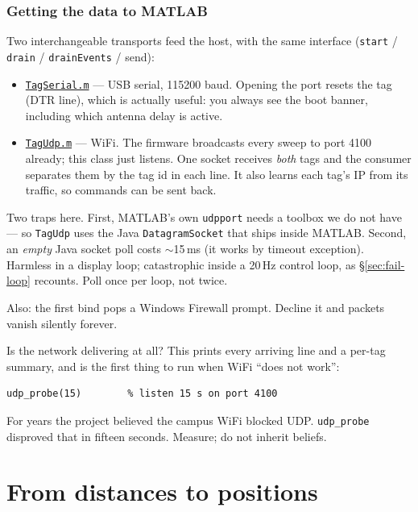 \documentclass[11pt,a4paper]{article}
\newcommand{\gh}[2]{\href{https://github.com/AdershM-2/UWB_3/blob/main/#1}{\texttt{#2}}}
\newcommand{\code}[1]{\texttt{#1}}
\begin{document}
\section{Getting the data to MATLAB}
\label{sec:transport}

Two interchangeable transports feed the host, with the same interface
(\code{start} / \code{drain} / \code{drainEvents} / send):

\begin{itemize}
\item \gh{matlab/+dune/TagSerial.m}{TagSerial.m} --- USB serial, 115200 baud.
      Opening the port resets the tag (DTR line), which is actually useful: you
      always see the boot banner, including which antenna delay is active.
\item \gh{matlab/+dune/TagUdp.m}{TagUdp.m} --- WiFi. The firmware broadcasts every
      sweep to port 4100 already; this class just listens. One socket receives
      \emph{both} tags and the consumer separates them by the tag id in each line.
      It also learns each tag's IP from its traffic, so commands can be sent back.
\end{itemize}

\begin{pitfall}
Two traps here. First, MATLAB's own \code{udpport} needs a toolbox we do not have
--- so \code{TagUdp} uses the Java \code{DatagramSocket} that ships inside MATLAB.
Second, an \emph{empty} Java socket poll costs $\sim$15\,ms (it works by timeout
exception). Harmless in a display loop; catastrophic inside a 20\,Hz control loop,
as \S\ref{sec:fail-loop} recounts. Poll once per loop, not twice.

Also: the first bind pops a Windows Firewall prompt. Decline it and packets vanish
silently forever.
\end{pitfall}

\begin{tryit}
Is the network delivering at all? This prints every arriving line and a per-tag
summary, and is the first thing to run when WiFi ``does not work'':
\begin{lstlisting}
udp_probe(15)        % listen 15 s on port 4100
\end{lstlisting}
For years the project believed the campus WiFi blocked UDP. \code{udp\_probe}
disproved that in fifteen seconds. Measure; do not inherit beliefs.
\end{tryit}

\part{From distances to positions}
\end{document}
